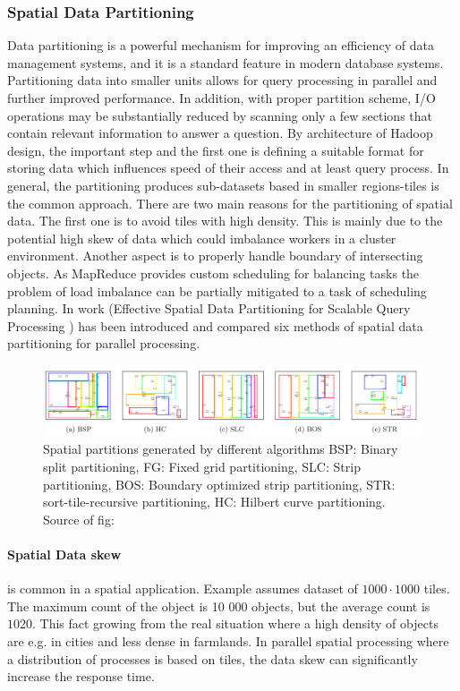 \documentclass[a4paper,12pt,oneside]{report}
\begin{document}
		\subsubsection{Spatial Data Partitioning}
		\label{Spatial_Data_Partitioning}
Data partitioning is a powerful mechanism for improving an efficiency of data management systems, 
and it is a standard feature in modern database systems. Partitioning data into smaller units allows 
for query processing in parallel and further improved performance. In addition,
with proper partition scheme, I/O operations may be substantially
reduced by scanning only a few sections that contain relevant information to answer a question.
By architecture of Hadoop design, the important step and the first one is defining a suitable format for 
storing data which influences  speed of their access and at least query process. In general, the 
partitioning produces sub-datasets based in smaller regions-tiles is the common approach.
There are two main reasons for the partitioning of spatial data. 
The first one is to avoid tiles with high density. This is mainly due to the potential high 
skew\cite{spatial_skew} of data which could imbalance workers in a cluster environment. Another aspect is to  
properly handle boundary of intersecting objects. As MapReduce provides custom
scheduling  for balancing tasks the problem of load imbalance can be partially 
mitigated to a task of scheduling planning. In work (Effective Spatial Data Partitioning for Scalable Query 
Processing \cite{partitioning}) has been introduced and compared six methods of spatial data partitioning for parallel processing. 

\begin{figure}[h!]
    \centering
    \includegraphics[width=1\textwidth]{./img/part_overview.png}
    \caption[mapreduce flow]{\centering  Spatial partitions generated by different algorithms BSP: Binary split 
    partitioning, FG: Fixed grid
partitioning, SLC: Strip partitioning, BOS: Boundary optimized strip partitioning, STR: sort-tile-recursive
partitioning, HC: Hilbert curve partitioning. Source of fig: \cite{partitioning}}
 \end{figure} 

\paragraph{Spatial Data skew} is common in a spatial application. Example \cite{hadoopGIS} assumes dataset of 
$1000\cdot1000$ tiles. The maximum count of the object is 10 000 objects, but the average count is $1020$. This 
fact growing from the real situation where a high density of objects are e.g. in cities and less dense in farmlands. 
In parallel spatial processing where a distribution of processes is based on tiles, the data skew can significantly 
increase the response time.
\end{document}
